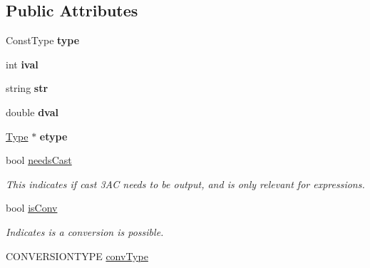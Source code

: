 \subsection*{Public Attributes}
\begin{DoxyCompactItemize}
\item 
\hypertarget{classAstConstant_ad350f1bd35d56369731660f8f8c826e7}{Const\-Type {\bfseries type}}\label{classAstConstant_ad350f1bd35d56369731660f8f8c826e7}

\item 
\hypertarget{classAstConstant_a45b3874ec43dac2b0b56fca2f70ae310}{int {\bfseries ival}}\label{classAstConstant_a45b3874ec43dac2b0b56fca2f70ae310}

\item 
\hypertarget{classAstConstant_a79f98612fb8aa367b279ad199c794b31}{string {\bfseries str}}\label{classAstConstant_a79f98612fb8aa367b279ad199c794b31}

\item 
\hypertarget{classAstConstant_a6a7521fd6217f7d8eba703ba6877be9d}{double {\bfseries dval}}\label{classAstConstant_a6a7521fd6217f7d8eba703ba6877be9d}

\item 
\hypertarget{classAstConstant_a509ff0f489033b055f21b984dcb96b8f}{\hyperlink{classType}{Type} $\ast$ {\bfseries etype}}\label{classAstConstant_a509ff0f489033b055f21b984dcb96b8f}

\item 
\hypertarget{classAST_aaf215802de409f8096c063d01ffa6783}{bool \hyperlink{classAST_aaf215802de409f8096c063d01ffa6783}{needs\-Cast}}\label{classAST_aaf215802de409f8096c063d01ffa6783}

\begin{DoxyCompactList}\small\item\em This indicates if cast 3\-A\-C needs to be output, and is only relevant for expressions. \end{DoxyCompactList}\item 
\hypertarget{classAST_afa9e77ef650ec6664458fa6cb55be985}{bool \hyperlink{classAST_afa9e77ef650ec6664458fa6cb55be985}{is\-Conv}}\label{classAST_afa9e77ef650ec6664458fa6cb55be985}

\begin{DoxyCompactList}\small\item\em Indicates is a conversion is possible. \end{DoxyCompactList}\item 
\hypertarget{classAST_a61ef3317e023d45237e06615b387cd6b}{C\-O\-N\-V\-E\-R\-S\-I\-O\-N\-T\-Y\-P\-E \hyperlink{classAST_a61ef3317e023d45237e06615b387cd6b}{conv\-Type}}\label{classAST_a61ef3317e023d45237e06615b387cd6b}


\end{DoxyCompactItemize}
